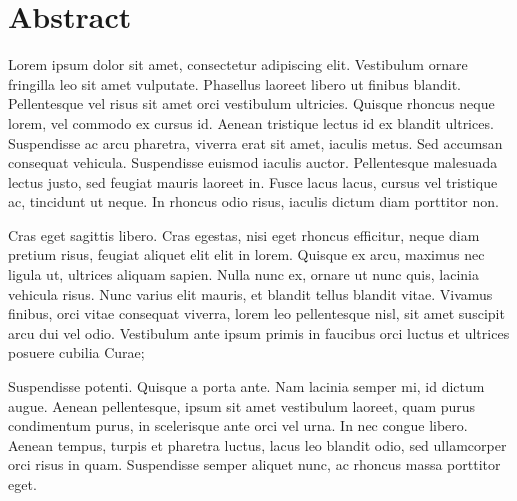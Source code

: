 \chapter*{Abstract}

Lorem ipsum dolor sit amet, consectetur adipiscing elit. Vestibulum ornare fringilla leo sit amet vulputate. Phasellus laoreet libero ut finibus blandit. Pellentesque vel risus sit amet orci vestibulum ultricies. Quisque rhoncus neque lorem, vel commodo ex cursus id. Aenean tristique lectus id ex blandit ultrices. Suspendisse ac arcu pharetra, viverra erat sit amet, iaculis metus. Sed accumsan consequat vehicula. Suspendisse euismod iaculis auctor. Pellentesque malesuada lectus justo, sed feugiat mauris laoreet in. Fusce lacus lacus, cursus vel tristique ac, tincidunt ut neque. In rhoncus odio risus, iaculis dictum diam porttitor non.

Cras eget sagittis libero. Cras egestas, nisi eget rhoncus efficitur, neque diam pretium risus, feugiat aliquet elit elit in lorem. Quisque ex arcu, maximus nec ligula ut, ultrices aliquam sapien. Nulla nunc ex, ornare ut nunc quis, lacinia vehicula risus. Nunc varius elit mauris, et blandit tellus blandit vitae. Vivamus finibus, orci vitae consequat viverra, lorem leo pellentesque nisl, sit amet suscipit arcu dui vel odio. Vestibulum ante ipsum primis in faucibus orci luctus et ultrices posuere cubilia Curae;

Suspendisse potenti. Quisque a porta ante. Nam lacinia semper mi, id dictum augue. Aenean pellentesque, ipsum sit amet vestibulum laoreet, quam purus condimentum purus, in scelerisque ante orci vel urna. In nec congue libero. Aenean tempus, turpis et pharetra luctus, lacus leo blandit odio, sed ullamcorper orci risus in quam. Suspendisse semper aliquet nunc, ac rhoncus massa porttitor eget. 